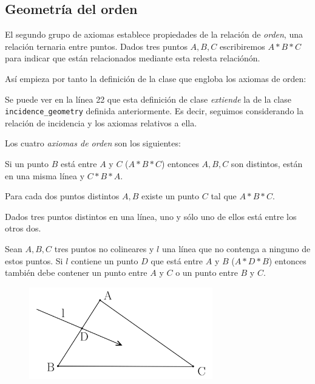 \subsection{Geometría del orden}

El segundo grupo de axiomas establece propiedades de la relación de
\textit{orden}, una relación ternaria entre puntos. Dados tres puntos $A, B, C$
escribiremos $A * B * C$ para indicar que están relacionados mediante esta
relesta relaciónón.

Así empieza por tanto la definición de la clase que engloba los axiomas de
orden:


Se puede ver en la línea 22 que esta definición de clase \textit{extiende} la de
la clase \lstinline{incidence_geometry} definida anteriormente. Es decir,
seguimos considerando la relación de incidencia y los axiomas relativos a ella.

Los cuatro \textit{axiomas de orden} son los siguientes:

\begin{ax}\label{ax:B1}
	Si un punto $B$ está entre $A$ y $C$ ($A * B * C$) entonces $A, B, C$ son
	distintos, están en una misma línea y $C * B * A$.
\end{ax}


\begin{ax}\label{ax:B2}
	Para cada dos puntos distintos $A,B$ existe un punto $C$ tal que $A * B * C$.
\end{ax}


\begin{ax}\label{ax:3}
	Dados tres puntos distintos en una línea, uno y sólo uno de ellos está entre
	los otros dos.
\end{ax}


\begin{ax}[Pasch]\label{ax:4}
	Sean $A, B, C$ tres puntos no colineares y $l$ una línea que no contenga a
	ninguno de estos puntos. Si $l$ contiene un punto $D$ que está entre $A$ y $B$
	($A * D * B$) entonces también debe contener un punto entre $A$ y $C$ o un
	punto entre $B$ y $C$.
\end{ax}

\begin{figure}[htbp]
	\centerline{\includegraphics[width=8cm]{./imgs/pasch.png}}
	\label{figure:pasch}
\end{figure}

